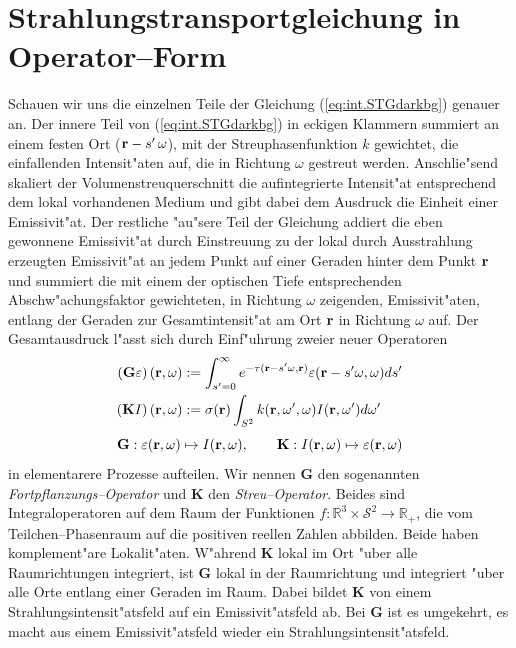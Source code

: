 	\section{Strahlungstransportgleichung in Operator--Form}
	Schauen wir uns die einzelnen Teile der Gleichung (\ref{eq:int.STGdarkbg}) genauer an.
	Der innere Teil von (\ref{eq:int.STGdarkbg}) in eckigen Klammern summiert an einem festen Ort ($\mathbf{r}-s'\,\omega$), mit der Streuphasenfunktion $k$ gewichtet, die einfallenden Intensit"aten auf, die in Richtung $\omega$ gestreut werden. Anschlie"send skaliert der Volumenstreuquerschnitt die aufintegrierte Intensit"at entsprechend dem lokal vorhandenen Medium und gibt dabei dem Ausdruck die Einheit einer Emissivit"at.
	Der restliche "au"sere Teil der Gleichung addiert die eben gewonnene Emissivit"at durch Einstreuung zu der lokal durch Ausstrahlung erzeugten Emissivit"at an jedem Punkt auf einer Geraden hinter dem Punkt $\mathbf{r}$ und summiert die mit einem der optischen Tiefe entsprechenden Abschw"achungsfaktor gewichteten, in Richtung $\omega$ zeigenden, Emissivit"aten, entlang der Geraden zur Gesamtintensit"at am Ort $\mathbf{r}$ in Richtung $\omega$ auf.
	Der Gesamtausdruck l"asst sich durch Einf"uhrung zweier neuer Operatoren
	\begin{align*}
		\left(\mathbf{G}\varepsilon\right)(\mathbf{r},\omega)&:=\int_{s'=0}^\infty e^{-\tau(\mathbf{r}-s' \omega,\mathbf{r})}\varepsilon(\mathbf{r}-s' \omega,\omega) ds' \\
		\left(\mathbf{K}I\right)(\mathbf{r},\omega)&:=\sigma(\mathbf{r})\int_{S^2} k(\mathbf{r},\omega',\omega) I(\mathbf{r},\omega') d\omega'
	\end{align*}
	\begin{equation*}
		\mathbf{G} : \varepsilon(\mathbf{r},\omega) \mapsto I(\mathbf{r},\omega) , \qquad
		\mathbf{K} : I(\mathbf{r},\omega) \mapsto \varepsilon(\mathbf{r},\omega)
	\end{equation*}
	in elementarere Prozesse aufteilen. Wir nennen $\mathbf{G}$ den sogenannten {\em Fortpflanzungs--Operator} und $\mathbf{K}$ den {\em Streu--Operator}. Beides sind Integraloperatoren auf dem Raum der Funktionen $f : \mathbb{R}^3 \times \mathcal{S}^2 \to \mathbb{R}_+$, die vom Teilchen--Phasenraum auf die positiven reellen Zahlen abbilden. Beide haben komplement"are Lokalit"aten. W"ahrend $\mathbf{K}$ lokal im Ort "uber alle Raumrichtungen integriert, ist $\mathbf{G}$ lokal in der Raumrichtung und integriert "uber alle Orte entlang einer Geraden im Raum. Dabei bildet $\mathbf{K}$ von einem Strahlungsintensit"atsfeld auf ein Emissivit"atsfeld ab. Bei $\mathbf{G}$ ist es umgekehrt, es macht aus einem Emissivit"atsfeld wieder ein Strahlungsintensit"atsfeld.
